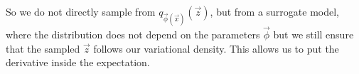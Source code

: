 So we do not directly sample from $q_{\vec{\phi}(\vec{x})}(\vec{z})$, but from a surrogate model, where the distribution does not
depend on the parameters $\vec{\phi}$ but we still ensure that the sampled $\vec{z}$ follows our variational density. This
allows us to put the derivative inside the expectation.

\pagebreak